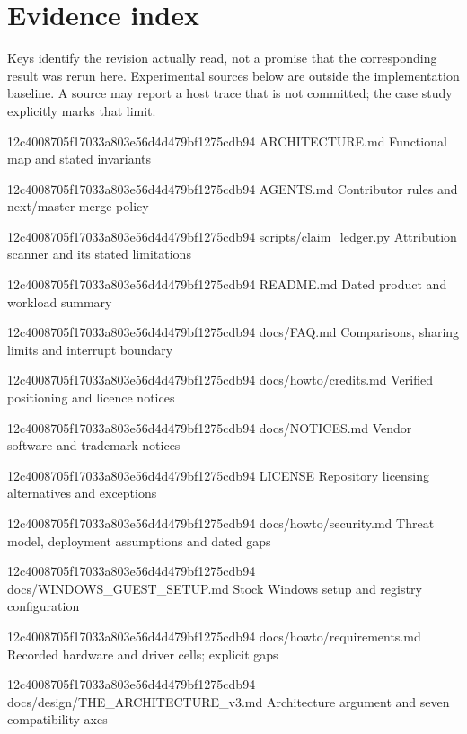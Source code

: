 \section{Evidence index}
\label{sec:evidence}
Keys identify the revision actually read, not a promise that the corresponding result was
rerun here. Experimental sources below are outside the implementation baseline. A source
may report a host trace that is not committed; the case study explicitly marks that limit.
\begin{description}[style=nextline]

{12c4008705f17033a803e56d4d479bf1275cdb94}
{ARCHITECTURE.md}
{Functional map and stated invariants}

{12c4008705f17033a803e56d4d479bf1275cdb94}
{AGENTS.md}
{Contributor rules and next/master merge policy}

{12c4008705f17033a803e56d4d479bf1275cdb94}
{scripts/claim_ledger.py}
{Attribution scanner and its stated limitations}

{12c4008705f17033a803e56d4d479bf1275cdb94}
{README.md}
{Dated product and workload summary}

{12c4008705f17033a803e56d4d479bf1275cdb94}
{docs/FAQ.md}
{Comparisons, sharing limits and interrupt boundary}

{12c4008705f17033a803e56d4d479bf1275cdb94}
{docs/howto/credits.md}
{Verified positioning and licence notices}

{12c4008705f17033a803e56d4d479bf1275cdb94}
{docs/NOTICES.md}
{Vendor software and trademark notices}

{12c4008705f17033a803e56d4d479bf1275cdb94}
{LICENSE}
{Repository licensing alternatives and exceptions}

{12c4008705f17033a803e56d4d479bf1275cdb94}
{docs/howto/security.md}
{Threat model, deployment assumptions and dated gaps}

{12c4008705f17033a803e56d4d479bf1275cdb94}
{docs/WINDOWS_GUEST_SETUP.md}
{Stock Windows setup and registry configuration}

{12c4008705f17033a803e56d4d479bf1275cdb94}
{docs/howto/requirements.md}
{Recorded hardware and driver cells; explicit gaps}

{12c4008705f17033a803e56d4d479bf1275cdb94}
{docs/design/THE_ARCHITECTURE_v3.md}
{Architecture argument and seven compatibility axes}


\end{description}
